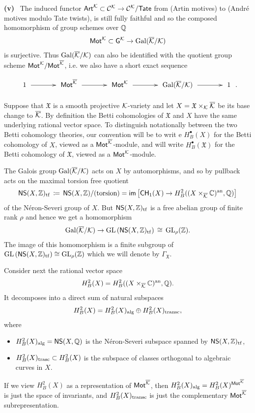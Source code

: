 \documentclass[twoside,leqno]{article}
\numberwithin{equation}{section}
\theoremstyle{plain}
\theoremstyle{definition}
\begin{document}
\medskip

\noindent
{\bfseries (v)} \ The induced functor $\mathsf{Art}^{\mathcal K}  \subset \mathcal{C}^{\mathcal K}
\to \mathcal{C}^{\mathcal K}/\mathsf{Tate}$ from (Artin motives) to (Andr\'{e}
motives modulo Tate twists), is still fully faithful and so the
composed homomorphism of group schemes over $\mathbb Q$
\[
\mathsf{Mot}^{\mathcal K} \subset \mathsf{G}^{\mathcal K} \to \operatorname{Gal}(\overline{\mathcal K}/\mathcal K)
\]
is surjective. Thus $\operatorname{Gal}(\overline{\mathcal K}/\mathcal K)$ can also be
identified with the quotient group scheme
$\mathsf{Mot}^{\mathcal K}/\mathsf{Mot}^{\overline{\mathcal K}}$,  i.e. we also  
have a short exact sequence
\[
\xymatrix@1@M+0.5pc@C+1pc{ 1 \ar[r] & \motM^{\kaybar} \ar[r] & \motM^{\kay}
  \ar[r] & \Gal(\kaybar/\kay) \ar[r] & 1}.
\]


Suppose that $\mathfrak{X}$ is a smooth projective $\mathcal K$-variety and
let $X = \mathfrak{X}\times_{\mathcal K} \overline{\mathcal K}$ be its base change to
$\overline{\mathcal K}$. By definition the Betti cohomologies of $\mathfrak{X}$ and
$X$ have the same underlying rational vector space. To distinguish
notationally between the two Betti cohomology theories, our convention
will be to writ e $H^{\bullet}_{B}(X)$ for the Betti cohomology of
$X$, viewed as a $\mathsf{Mot}^{\overline{\mathcal K}}$-module, and will write
$H^{\bullet}_{B}(\mathfrak{X})$ for the Betti cohomology of
$\mathfrak{X}$, viewed as a $\mathsf{Mot}^{\mathcal K}$-module. 

\medskip


The Galois group $\operatorname{Gal}(\overline{\mathcal K}/\mathcal K)$ acts on
$X$ by automorphisms, and so by pullback acts on the maximal torsion
free quotient  
\[
\mathsf{NS}(X,\mathbb Z)_{\operatorname{tf}} \, \coloneqq \, \mathsf{NS}(X,\mathbb Z)/(\text{torsion}) =
\mathsf{im}\left[\mathsf{CH}_{1}(X) \to
  H^{2}_{B}((X\times_{\overline{\mathcal K}}\mathbb C)^{\operatorname{an}},\mathbb Q)\right]
\]
of the N\'{e}ron-Severi group of $X$. But
$\mathsf{NS}(X,\mathbb Z)_{\operatorname{tf}}$ is a free abelian group of
finite rank $\rho$ and hence we get a homomorphism
\[
\operatorname{Gal}(\overline{\mathcal K}/\mathcal K) \to
\operatorname{GL}\left(\mathsf{NS}(X,\mathbb Z)_{\operatorname{tf}}\right) \, \cong
\, \operatorname{GL}_{\rho}(\mathbb Z).
\]
The image of this homomorphism is a finite subgroup of
$\operatorname{GL}\left(\mathsf{NS}(X,\mathbb Z)_{\operatorname{tf}}\right) \cong
\operatorname{GL}_{\rho}(\mathbb Z)$ which we will denote by $\Gamma_{\mathfrak{X}}$.

\medskip

Consider next the rational vector space 
\[
H^{2}_{B}(X) =
H^{2}_{B}((X\times_{\overline{\mathcal K}} \mathbb C)^{\operatorname{an}},\mathbb Q).
\]
It decomposes into a direct sum  of natural subspaces 
\begin{equation} \label{eq:decompH2X}
H^{2}_{B}(X) =  H^{2}_{B}(X)_{\operatorname{alg}}\oplus H^{2}_{B}(X)_{\operatorname{transc}},
\end{equation}
where
\begin{itemize}
\item $H^{2}_{B}(X)_{\operatorname{alg}} = \mathsf{NS}(X,\mathbb Q)$ is the N\'{e}ron-Severi
  subspace  spanned by
  $\mathsf{NS}(X,\mathbb Z)_{\operatorname{tf}}$,
\item $H^{2}_{B}(X)_{\operatorname{trasc}} \subset H^{2}_{B}(X)$ is the subspace
  of classes orthogonal to algebraic curves in $X$.
\end{itemize} 
If we view $H^{2}_{B}(X)$ as a representation of $\mathsf{Mot}^{\overline{\mathcal K}}$,
then $H^{2}_{B}(X)_{\operatorname{alg}} = H^{2}_{B}(X)^{\mathsf{Mot}^{\overline{\mathcal K}}}$ is
just the space of invariants, and $H^{2}_{B}(X)_{\operatorname{transc}}$ is just
the complementary $\mathsf{Mot}^{\overline{\mathcal K}}$ subrepresentation.
\end{document}
